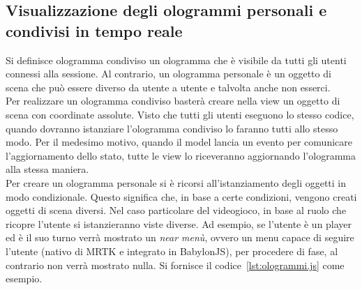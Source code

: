 \subsection{Visualizzazione degli ologrammi personali e condivisi in tempo reale}
Si definisce ologramma condiviso un ologramma che è visibile da tutti gli utenti connessi alla sessione. Al contrario, un ologramma personale è un oggetto di scena che può essere diverso
da utente a utente e talvolta anche non esserci.\\
Per realizzare un ologramma condiviso basterà creare nella view un oggetto di scena con coordinate assolute. Visto che tutti gli utenti eseguono lo stesso codice, quando
dovranno istanziare l'ologramma condiviso lo faranno tutti allo stesso modo. Per il medesimo motivo, quando il model lancia un evento per comunicare l'aggiornamento dello stato, tutte le 
view lo riceveranno aggiornando l'ologramma alla stessa maniera.\\
Per creare un ologramma personale si è ricorsi all'istanziamento degli oggetti in modo condizionale. Questo significa che, in base a certe condizioni, vengono creati oggetti di scena 
diversi. Nel caso particolare del videogioco, in base al ruolo che ricopre l'utente si istanzieranno viste diverse. Ad esempio, se l'utente è un player ed è il suo turno verrà mostrato un
\textit{near menù}, ovvero un menu capace di seguire l'utente (nativo di MRTK e integrato in BabylonJS), per procedere di fase, al contrario non verrà mostrato nulla. Si fornisce il 
codice~\ref{lst:ologrammi.js} come esempio. 

